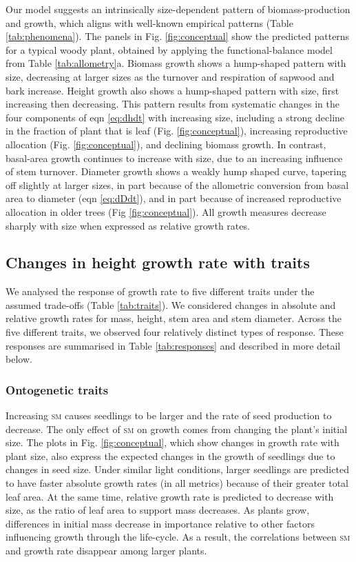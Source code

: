 \documentclass[9pt,twocolumn,twoside,lineno]{pnas-new}
\newcommand{\seed}{\textsc{sm}}
\begin{document}
Our model suggests an intrinsically size-dependent pattern of biomass-production and growth, which aligns with well-known empirical patterns (Table \ref{tab:phenomena}). The panels in Fig. \ref{fig:conceptual} show the predicted patterns for a typical woody plant, obtained by applying the functional-balance model from Table \ref{tab:allometry}a. Biomass growth shows a hump-shaped pattern with size, decreasing at larger sizes as the turnover and respiration of sapwood and bark increase. Height growth also shows a hump-shaped pattern with size, first increasing then decreasing. This pattern results from systematic changes in the four components of eqn \ref{eq:dhdt} with increasing size, including a strong decline in the fraction of plant that is leaf (Fig. \ref{fig:conceptual}), increasing reproductive allocation (Fig. \ref{fig:conceptual}), and declining biomass growth. In contrast, basal-area growth continues to increase with size, due to an increasing influence of stem turnover. Diameter growth shows a weakly hump shaped curve, tapering off slightly at larger sizes, in part because of the allometric conversion from basal area to diameter (eqn \ref{eq:dDdt}), and in part because of increased reproductive allocation in older trees (Fig \ref{fig:conceptual}). All growth measures decrease sharply with size when expressed as relative growth rates.

\subsection*{Changes in height growth rate with traits}

We analysed the response of growth rate to five different traits under the assumed trade-offs (Table \ref{tab:traits}). We considered changes in absolute and relative growth rates for mass, height, stem area and stem diameter. Across the five different traits, we observed four relatively distinct types of response. These responses are summarised in Table \ref{tab:responses} and described in more detail below.

\subsubsection*{Ontogenetic traits}  Increasing {\seed} causes seedlings to be larger and the rate of seed production to decrease. The only effect of {\seed} on growth comes from changing the plant's initial size. The plots in Fig. \ref{fig:conceptual}, which show changes in growth rate with plant size, also express the expected changes in the growth of seedlings due to changes in seed size. Under similar light conditions, larger seedlings are predicted to have faster absolute growth rates (in all metrics) because of their greater total leaf area. At the same time, relative growth rate is predicted to decrease with size, as the ratio of leaf area to support mass decreases. As plants grow, differences in initial mass decrease in importance relative to other factors influencing growth through the life-cycle. As a result, the correlations between {\seed} and growth rate disappear among larger plants.
\end{document}

